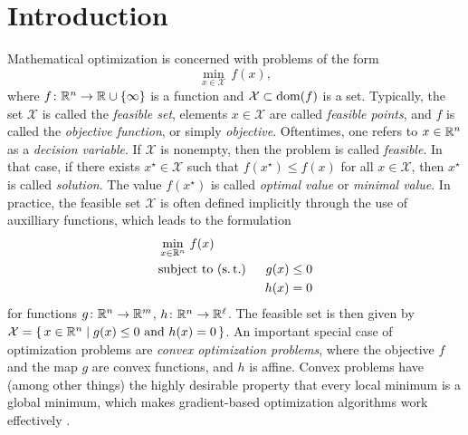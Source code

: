\chapter{Introduction}

Mathematical optimization is concerned with problems of the form
\[
  \min_{x\in \mathcal{X}} \, f(x),
\]
where $f\colon\mathbb{R}^n\to\mathbb{R}\cup\{\infty\}$ is a function and
$\mathcal{X}\subset\operatorname{dom}(f)$ is a set.
Typically, the set $\mathcal{X}$ is called the \textit{feasible set},
elements $x\in\mathcal{X}$ are called \textit{feasible points}, and $f$ is called the \textit{objective function},
or simply \textit{objective}.
Oftentimes, one refers to $x\in\mathbb{R}^n$ as a \textit{decision variable}.
If $\mathcal{X}$ is nonempty, then the problem is called \textit{feasible}.
In that case,
if there exists $x^\star\in\mathcal{X}$ such that $f(x^\star) \leq f(x)$ for all $x\in\mathcal{X}$,
then $x^\star$ is called \textit{solution}. The value $f(x^\star)$ is called
\textit{optimal value} or \textit{minimal value}.
In practice, the feasible set $\mathcal{X}$ is often defined implicitly through the use of auxilliary functions,
which leads to the formulation
\begin{equation}
    \label{eq:general-constrained-problem}
    \begin{aligned}
    &\min_{x \in \mathbb{R}^n} \, f(x) \\
    &\textup{subject to (s.\,t.)} \enspace &g(x) \leq 0 \notag \\
    &\phantom{\textup{s.\,t.}} \enspace &h(x) = 0 \notag
    \end{aligned}
\end{equation}
for functions $g\colon\mathbb{R}^n\to\mathbb{R}^m$, $h\colon\mathbb{R}^n\to\mathbb{R}^\ell$. The feasible
set is then given by $\mathcal{X} = \{\, x\in\mathbb{R}^n \mid g(x) \leq 0 \text{ and } h(x) = 0 \,\}$.
An important special case of optimization problems are
\textit{convex optimization problems}, where the objective $f$ and
the map $g$ are convex functions, and $h$ is affine.
Convex problems have (among other things) the highly desirable property that
every local minimum is a global minimum, which makes
gradient-based optimization algorithms
work effectively \cite{boyd2004convex}.

